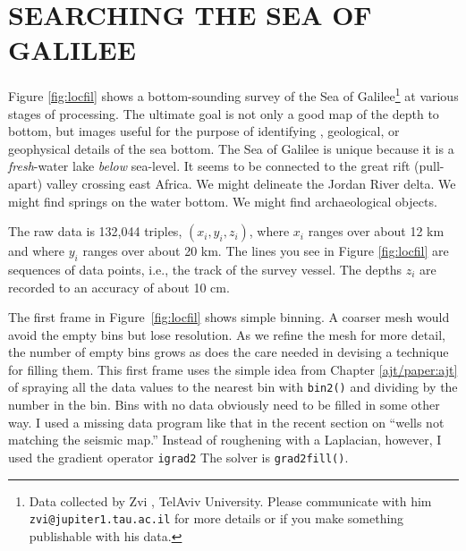 \section{SEARCHING THE SEA OF GALILEE}
Figure \ref{fig:locfil} shows a bottom-sounding survey
of the Sea of Galilee\footnote{
        Data collected by Zvi , TelAviv University.
        Please communicate with him {\tt zvi@jupiter1.tau.ac.il}
        for more details or if you make something
        publishable with his data.
        }
at various stages of processing.
The ultimate goal is not only a good map of
the depth to bottom,
but images useful for the purpose
of identifying , geological, or
geophysical details of the sea bottom.
The Sea of Galilee is unique
because it is a {\it fresh}-water lake {\it below} sea-level.
It seems to be connected to the great rift (pull-apart)
valley crossing east Africa.
We might delineate the Jordan River delta.
We might find springs on the water bottom.
We might find archaeological objects.
\par
{}
The raw data is 132,044 triples, $(x_i,y_i,z_i)$,
where $x_i$ ranges over about 12 km and
where $y_i$ ranges over about 20 km.
The lines you see in Figure \ref{fig:locfil}
are sequences of data points, i.e., the track of the survey vessel.
The depths $z_i$ are recorded to an accuracy of about 10 cm.
\par
The first frame in Figure~\ref{fig:locfil} shows simple binning.
A coarser mesh would avoid the empty bins but lose resolution.
As we refine the mesh for more detail,
the number of empty bins grows
as does the care needed in devising a technique
for filling them.
This first frame uses the simple idea from Chapter \ref{ajt/paper:ajt} of
spraying all the data values to the nearest bin
with \texttt{bin2()} 
and dividing by the number in the bin.
Bins with no data obviously need to be filled in some other way.
I used a missing data program like that in the recent section
on ``wells not matching the seismic map.''
Instead of roughening with a Laplacian, however,
I used the gradient operator \texttt{igrad2} 
The solver is \texttt{grad2fill()}.

